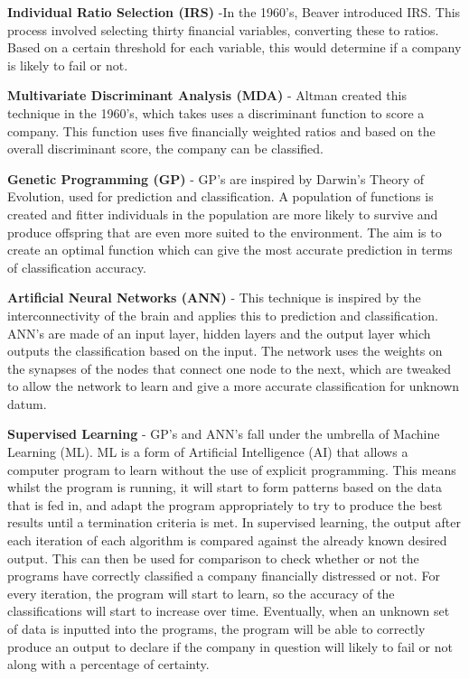 \documentclass[11pt]{article}
\begin{document}
\textbf{Individual Ratio Selection (IRS)} -In the 1960's, Beaver introduced IRS. This process involved selecting thirty financial variables, converting these to ratios. Based on a certain threshold for each variable, this would determine if a company is likely to fail or not.

\textbf{Multivariate Discriminant Analysis (MDA)} - Altman created this technique in the 1960's, which takes uses a discriminant function to score a company. This function uses five financially weighted ratios and based on the overall discriminant score, the company can be classified. 

\textbf{Genetic Programming (GP)} - GP's are inspired by Darwin's Theory of Evolution, used for prediction and classification. A population of functions is created and fitter individuals in the population are more likely to survive and produce offspring that are even more suited to the environment. The aim is to create an optimal function which can give the most accurate prediction in terms of classification accuracy. 

\textbf{Artificial Neural Networks (ANN)} - This technique is inspired by the interconnectivity of the brain and applies this to prediction and classification. ANN's are made of an input layer, hidden layers and the output layer which outputs the classification based on the input. The network uses the weights on the synapses of the nodes that connect one node to the next, which are tweaked to allow the network to learn and give a more accurate classification for unknown datum. 

\textbf{Supervised Learning} - GP's and ANN's fall under the umbrella of Machine Learning (ML). ML is a form of Artificial Intelligence (AI) that allows a computer program to learn without the use of explicit programming. This means whilst the program is running, it will start to form patterns based on the data that is fed in, and adapt the program appropriately to try to produce the best results until a termination criteria is met.
In supervised learning, the output after each iteration of each algorithm is compared against the already known desired output. This can then be used for comparison to check whether or not the programs have correctly classified a company financially distressed or not. For every iteration, the program will start to learn, so the accuracy of the classifications will start to increase over time. Eventually, when an unknown set of data is inputted into the programs, the program will be able to correctly produce an output to declare if the company in question will likely to fail or not along with a percentage of certainty.\\ 
\end{document}
